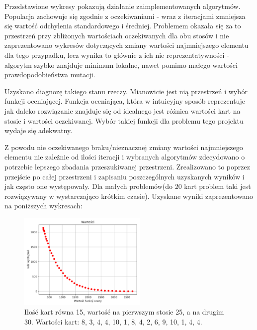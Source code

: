 \documentclass[12pt]{article}
\begin{document}
Przedstawione wykresy pokazują działanie zaimplementowanych algorytmów. Populacja zachowuje się zgodnie z oczekiwaniami - wraz z iteracjami zmniejsza się wartość odchylenia standardowego i średniej. Problemem okazała się za to przestrzeń przy zbliżonych wartościach oczekiwanych dla obu stosów  i nie zaprezentowano wykresów dotyczących zmiany wartości najmniejszego elementu dla tego przypadku, lecz wynika to głównie z ich nie reprezentatywności - algorytm szybko znajduje minimum lokalne, nawet pomimo małego wartości prawdopodobieństwa mutacji.

Uzyskano diagnozę takiego stanu rzeczy. Mianowicie jest nią przestrzeń i wybór funkcji oceniającej. Funkcja oceniająca, która w intuicyjny sposób reprezentuje jak daleko rozwiązanie znajduje się od idealnego jest różnica wartości kart na stosie i wartości oczekiwanej. Wybór takiej funkcji dla problemu tego projektu wydaje się adekwatny. 

Z powodu nie oczekiwanego braku/nieznacznej zmiany wartości najmniejszego elementu nie zależnie od ilości iteracji i wybranych algorytmów zdecydowano o potrzebie lepszego zbadania przeszukiwanej przestrzeni. Zrealizowano to poprzez przejście po całej przestrzeni i zapisaniu poszczególnych uzyskanych wyników i jak często one występowały. Dla małych problemów(do 20 kart problem taki jest rozwiązywany w wystarczająco krótkim czasie). Uzyskane wyniki zaprezentowano na poniższych wykresach:

\begin{figure}[h]
	\centering					\includegraphics[width=0.55\textwidth]{1Values.png}
	\caption{Ilość kart równa 15, wartość na pierwszym stosie 25, a na drugim 30. Wartości kart: 8, 3, 4, 4, 10, 1, 8, 4, 2, 6, 9, 10, 1, 4, 4.}
	\label{fig1}
\end{figure}

\newpage
\end{document}
